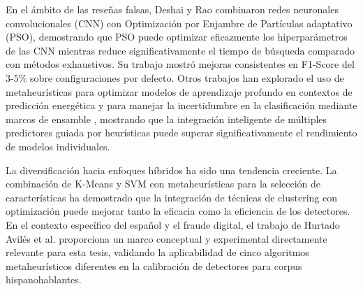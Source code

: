 En el ámbito de las reseñas falsas, Deshai y Rao \cite{deshai2023unmasking} combinaron redes neuronales convolucionales (CNN) con Optimización por Enjambre de Partículas adaptativo (PSO), demostrando que PSO puede optimizar eficazmente los hiperparámetros de las CNN mientras reduce significativamente el tiempo de búsqueda comparado con métodos exhaustivos. Su trabajo mostró mejoras consistentes en F1-Score del 3-5\% sobre configuraciones por defecto. Otros trabajos han explorado el uso de metaheurísticas para optimizar modelos de aprendizaje profundo en contextos de predicción energética \cite{bacanin2023benefits} y para manejar la incertidumbre en la clasificación mediante marcos de ensamble \cite{das2022heuristic}, mostrando que la integración inteligente de múltiples predictores guiada por heurísticas puede superar significativamente el rendimiento de modelos individuales.

La diversificación hacia enfoques híbridos ha sido una tendencia creciente. La combinación de K-Means y SVM con metaheurísticas para la selección de características \cite{yazdi2020improving} ha demostrado que la integración de técnicas de clustering con optimización puede mejorar tanto la eficacia como la eficiencia de los detectores. En el contexto específico del español y el fraude digital, el trabajo de Hurtado Avilés et al. \cite{hurtado2024calibracion} proporciona un marco conceptual y experimental directamente relevante para esta tesis, validando la aplicabilidad de cinco algoritmos metaheurísticos diferentes en la calibración de detectores para corpus hispanohablantes.

